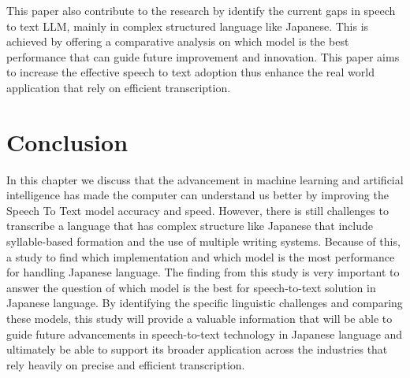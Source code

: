This paper also contribute to the research by identify the current gaps in speech to text LLM, mainly in complex structured language like Japanese. This is achieved by offering a comparative analysis on which model is the best performance that can guide future improvement and innovation. This paper aims to increase the effective speech to text adoption thus enhance the real world application that rely on efficient transcription. 



\section{Conclusion}
In this chapter we discuss that the advancement in machine learning and artificial intelligence has made the computer can understand us better by improving the Speech To Text model accuracy and speed. However, there is still challenges to transcribe a language that has complex structure like Japanese that include syllable-based formation and the use of multiple writing systems. Because of this, a study to find which implementation and which model is the most performance for handling Japanese language. The finding from this study is very important to answer the question of which model is the best for speech-to-text solution in Japanese language. By  identifying the specific linguistic challenges and comparing these models, this study will provide a valuable information that will be able to guide future advancements in speech-to-text technology in Japanese language and ultimately be able to support its broader application across the industries that rely heavily on precise and efficient transcription.

